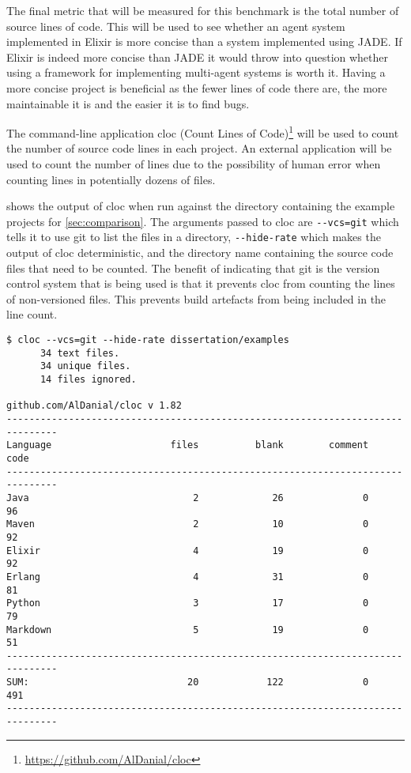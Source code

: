 The final metric that will be measured for this benchmark is the total number of source lines of code.
This will be used to see whether an agent system implemented in Elixir is more concise than a system implemented using JADE\@.
If Elixir is indeed more concise than JADE it would throw into question whether using a framework for implementing multi-agent systems is worth it.
Having a more concise project is beneficial as the fewer lines of code there are, the more maintainable it is and the easier it is to find bugs.

The command-line application cloc (Count Lines of Code)\footnote{\url{https://github.com/AlDanial/cloc}} will be used to count the number of source code lines in each project.
An external application will be used to count the number of lines due to the possibility of human error when counting lines in potentially dozens of files.

 shows the output of cloc when run against the directory containing the example projects for \cref{sec:comparison}.
The arguments passed to cloc are \verb|--vcs=git| which tells it to use git to list the files in a directory, \verb|--hide-rate| which makes the output of cloc deterministic, and the directory name containing the source code files that need to be counted.
The benefit of indicating that git is the version control system that is being used is that it prevents cloc from counting the lines of non-versioned files.
This prevents build artefacts from being included in the line count.

\begin{lstlisting}[numbers=none,float=ht,label=lst:cloc,caption=Output of cloc when run on the example projects]
$ cloc --vcs=git --hide-rate dissertation/examples
      34 text files.
      34 unique files.
      14 files ignored.

github.com/AlDanial/cloc v 1.82
-------------------------------------------------------------------------------
Language                     files          blank        comment           code
-------------------------------------------------------------------------------
Java                             2             26              0             96
Maven                            2             10              0             92
Elixir                           4             19              0             92
Erlang                           4             31              0             81
Python                           3             17              0             79
Markdown                         5             19              0             51
-------------------------------------------------------------------------------
SUM:                            20            122              0            491
-------------------------------------------------------------------------------
\end{lstlisting}

